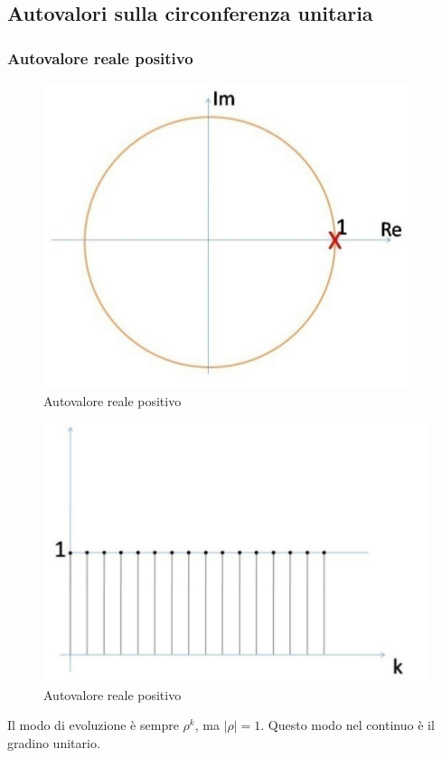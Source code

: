 \documentclass[a4paper]{report}
\begin{document}
\subsection{Autovalori sulla circonferenza unitaria}

\subsubsection{Autovalore reale positivo}
\begin{figure}[!h]
  \begin{center}
    \includegraphics[scale=0.4]{./figures/autovaloreRealePositivoCirconferenza00.png}
    \caption{Autovalore reale positivo}\label{fig:autovaloreRealePositivoCirconferenza00}
  \end{center}
\end{figure}
\begin{figure}[!h]
  \begin{center}
    \includegraphics[scale=0.4]{./figures/autovaloreRealePositivoCirconferenza01.png}
    \caption{Autovalore reale positivo}\label{fig:autovaloreRealePositivoCirconferenza01}
  \end{center}
\end{figure}
Il modo di evoluzione \`e sempre $\rho^k$, ma $|\rho| = 1$. Questo
modo nel continuo \`e il gradino unitario.
\end{document}
